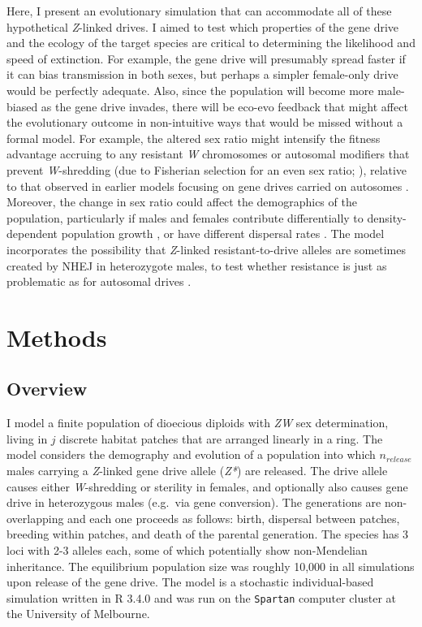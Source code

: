 \documentclass[]{rsos}%
\begin{document}
Here, I present an evolutionary simulation that can accommodate all of
these hypothetical \emph{Z}-linked drives. I aimed to test which
properties of the gene drive and the ecology of the target species are
critical to determining the likelihood and speed of extinction. For
example, the gene drive will presumably spread faster if it can bias
transmission in both sexes, but perhaps a simpler female-only drive
would be perfectly adequate. Also, since the population will become more
male-biased as the gene drive invades, there will be eco-evo feedback
that might affect the evolutionary outcome in non-intuitive ways that
would be missed without a formal model. For example, the altered sex
ratio might intensify the fitness advantage accruing to any resistant
\emph{W} chromosomes or autosomal modifiers that prevent
\emph{W}-shredding (due to Fisherian selection for an even sex ratio;
\citep{holman2015co}), relative to that observed in earlier models
focusing on gene drives carried on autosomes
\citep{unckless2017ev, drury2017cr}. Moreover, the change in sex ratio
could affect the demographics of the population, particularly if males
and females contribute differentially to density-dependent population
growth \citep{rankin2007ma, li2019int}, or have different dispersal
rates \citep{li2019sex}. The model incorporates the possibility that
\emph{Z}-linked resistant-to-drive alleles are sometimes created by NHEJ
in heterozygote males, to test whether resistance is just as problematic
as for autosomal drives
\citep{gantz2015mu, gantz2015hi, hammond2016cr, wang2016cr, unckless2017ev}.

\hypertarget{methods}{%
\section{Methods}\label{methods}}

\hypertarget{overview}{%
\subsection{Overview}\label{overview}}

I model a finite population of dioecious diploids with \emph{ZW} sex
determination, living in \(j\) discrete habitat patches that are
arranged linearly in a ring. The model considers the demography and
evolution of a population into which \(n_{release}\) males carrying a
\emph{Z}-linked gene drive allele (\emph{Z*}) are released. The drive
allele causes either \emph{W}-shredding or sterility in females, and
optionally also causes gene drive in heterozygous males (e.g.~via gene
conversion). The generations are non-overlapping and each one proceeds
as follows: birth, dispersal between patches, breeding within patches,
and death of the parental generation. The species has 3 loci with 2-3
alleles each, some of which potentially show non-Mendelian inheritance.
The equilibrium population size was roughly 10,000 in all simulations
upon release of the gene drive. The model is a stochastic
individual-based simulation written in R 3.4.0 and was run on the
\texttt{Spartan} computer cluster at the University of Melbourne.
\end{document}
